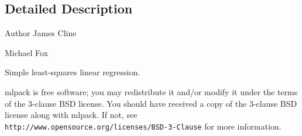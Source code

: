 \subsection{Detailed Description}
\begin{DoxyAuthor}{Author}
James Cline 

Michael Fox
\end{DoxyAuthor}
Simple least-\/squares linear regression.

mlpack is free software; you may redistribute it and/or modify it under the terms of the 3-\/clause B\+SD license. You should have received a copy of the 3-\/clause B\+SD license along with mlpack. If not, see {\tt http\+://www.\+opensource.\+org/licenses/\+B\+S\+D-\/3-\/\+Clause} for more information. 